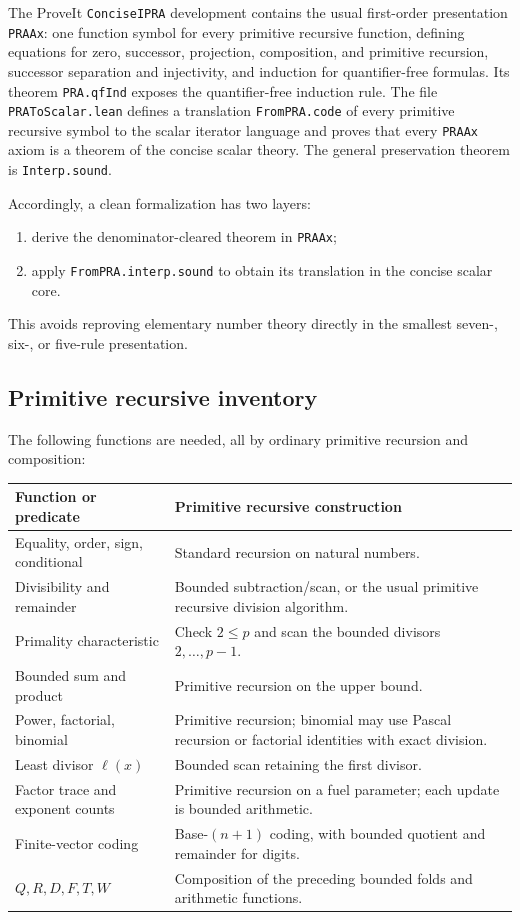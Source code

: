 \documentclass[11pt]{article}
\theoremstyle{definition}
\newcommand{\ProdP}{Q}
\newcommand{\NumP}{R}
\newcommand{\DenE}{D}
\newcommand{\Fact}{F}
\newcommand{\NumH}{T}
\newcommand{\Wit}{W}
\newcommand{\code}[1]{\texttt{#1}}
\begin{document}
The ProveIt \code{ConciseIPRA} development contains the usual first-order
presentation \code{PRAAx}: one function symbol for every primitive recursive
function, defining equations for zero, successor, projection, composition,
and primitive recursion, successor separation and injectivity, and induction
for quantifier-free formulas.  Its theorem \code{PRA.qfInd} exposes the
quantifier-free induction rule.  The file \code{PRAToScalar.lean} defines a
translation \code{FromPRA.code} of every primitive recursive symbol to the
scalar iterator language and proves that every \code{PRAAx} axiom is a theorem
of the concise scalar theory.  The general preservation theorem is
\code{Interp.sound}.

Accordingly, a clean formalization has two layers:
\begin{enumerate}[label=\arabic*.]
\item derive the denominator-cleared theorem in \code{PRAAx};
\item apply \code{FromPRA.interp.sound} to obtain its translation in the
      concise scalar core.
\end{enumerate}
This avoids reproving elementary number theory directly in the smallest
seven-, six-, or five-rule presentation.

\subsection{Primitive recursive inventory}

The following functions are needed, all by ordinary primitive recursion and
composition:
\begin{center}
\begin{tabular}{p{}p{}}
\toprule
Function or predicate & Primitive recursive construction \\
\midrule
Equality, order, sign, conditional & Standard recursion on natural numbers. \\
Divisibility and remainder & Bounded subtraction/scan, or the usual primitive recursive division algorithm. \\
Primality characteristic & Check \(2\leq p\) and scan the bounded divisors \(2,\ldots,p-1\). \\
Bounded sum and product & Primitive recursion on the upper bound. \\
Power, factorial, binomial & Primitive recursion; binomial may use Pascal recursion or factorial identities with exact division. \\
Least divisor \(\ell(x)\) & Bounded scan retaining the first divisor. \\
Factor trace and exponent counts & Primitive recursion on a fuel parameter; each update is bounded arithmetic. \\
Finite-vector coding & Base-\((n+1)\) coding, with bounded quotient and remainder for digits. \\
\(\ProdP,\NumP,\DenE,\Fact,\NumH,\Wit\) & Composition of the preceding bounded folds and arithmetic functions. \\
\bottomrule
\end{tabular}
\end{center}
\end{document}
